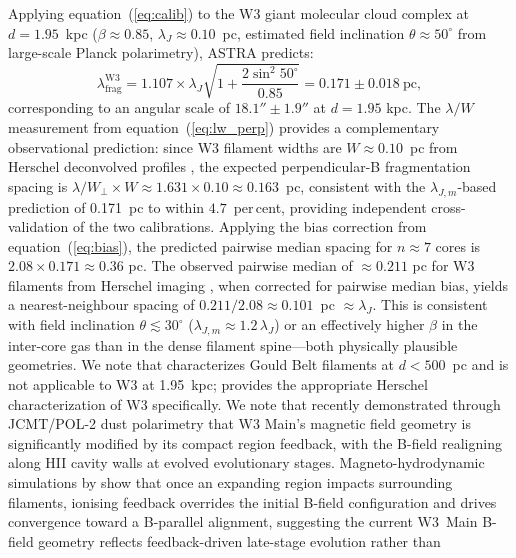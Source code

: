 \documentclass[usenatbib]{rasti}
\begin{document}
Applying equation~(\ref{eq:calib}) to the W3 giant molecular cloud complex at
$d = 1.95$~kpc ($\beta \approx 0.85$, $\lambda_J \approx 0.10$~pc, estimated field
inclination $\theta \approx 50^\circ$ from large-scale Planck polarimetry), ASTRA predicts:
\begin{equation}
\lambda_\mathrm{frag}^{\mathrm{W3}} = 1.107 \times \lambda_J \sqrt{1 + \frac{2\sin^2 50^\circ}{0.85}} = 0.171 \pm 0.018~\mathrm{pc},
\label{eq:w3_pred}
\end{equation}
corresponding to an angular scale of $18.1'' \pm 1.9''$ at $d = 1.95$ kpc.
The $\lambda/W$ measurement from equation~(\ref{eq:lw_perp}) provides a complementary
observational prediction: since W3 filament widths are $W \approx 0.10$~pc from Herschel
deconvolved profiles \citep{arzoumanian2019}, the expected perpendicular-B fragmentation
spacing is $\lambda/W_\perp \times W \approx 1.631 \times 0.10 \approx 0.163$~pc, consistent
with the $\lambda_{J,m}$-based prediction of 0.171~pc to within $4.7$~per\,cent, providing
independent cross-validation of the two calibrations.
Applying the bias correction from equation~(\ref{eq:bias}), the predicted pairwise
median spacing for $n \approx 7$ cores is $2.08 \times 0.171 \approx 0.36$ pc. The
observed pairwise median of $\approx 0.211$ pc for W3 filaments from Herschel imaging
\citep{rivera2013}, when corrected for pairwise median bias, yields a nearest-neighbour
spacing of $0.211/2.08 \approx 0.101$~pc $\approx \lambda_J$. This is consistent with
field inclination $\theta \lesssim 30^\circ$ ($\lambda_{J,m} \approx 1.2\,\lambda_J$) or
an effectively higher $\beta$ in the inter-core gas than in the dense filament spine---both
physically plausible geometries. We note that \citet{arzoumanian2019} characterizes Gould
Belt filaments at $d < 500$~pc and is not applicable to W3 at 1.95~kpc; \citet{rivera2013}
provides the appropriate Herschel characterization of W3 specifically. We note that
\citet{kumar2025w3bfield} recently demonstrated through JCMT/POL-2 dust polarimetry that
W3 Main's magnetic field geometry is significantly modified by its compact  region
feedback, with the B-field realigning along HII cavity walls at evolved evolutionary stages.
Magneto-hydrodynamic simulations by \citet{suin2025feedback} show that once an expanding
 region impacts surrounding filaments, ionising feedback overrides the initial
B-field configuration and drives convergence toward a B-parallel alignment, suggesting the
current W3~Main B-field geometry reflects feedback-driven late-stage evolution rather than
\end{document}
